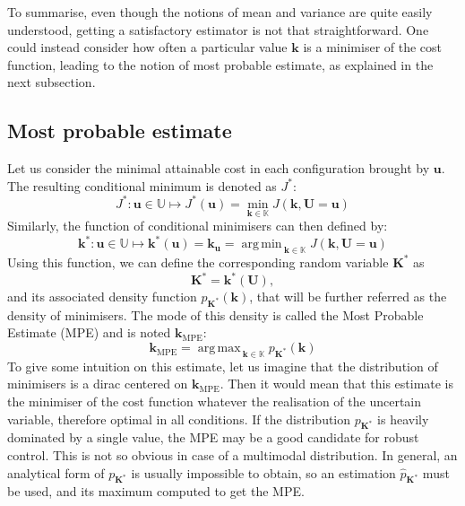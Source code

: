 \documentclass[preprint, 1p]{elsarticle}
\DeclareMathOperator*{\argmin}{arg\,min \,}
\DeclareMathOperator*{\argmax}{arg\,max \,}
\newcommand{\kmpe}{{\mathbf{k}}_{\mathrm{MPE}}}
\newcommand{\Kspace}{\mathbb{K}}
\newcommand{\Uspace}{\mathbb{U}}
\begin{document}
To summarise, even though the notions of mean and variance are quite easily understood, getting a satisfactory estimator is not that straightforward. One could instead consider how often a particular value $\mathbf{k}$ is a minimiser of the cost function, leading to the notion of most probable estimate, as explained in the next subsection.

\subsection{Most probable estimate}
Let us consider the minimal attainable cost in each configuration brought by $\mathbf{u}$.
The resulting conditional minimum is denoted as $J^*$:
\begin{equation}
\label{eq:def_Jstar}
J^*: \mathbf{u} \in\Uspace \longmapsto J^*(\mathbf{u}) = \min_{\mathbf{k}\in \Kspace} J(\mathbf{k},\mathbf{U}=\mathbf{u})
\end{equation}
Similarly, the function of conditional minimisers can then defined by:
  \begin{equation}
  \label{eq:conditional_minimiser}
   \mathbf{k}^*: \mathbf{u}\in\Uspace \longmapsto \mathbf{k}^*(\mathbf{u}) = \mathbf{k}_{\mathbf{u}}=  \argmin_{{\mathbf{k}}\in\Kspace} J({\mathbf{k}},\mathbf{U}=\mathbf{u})
  \end{equation}
Using this function, we can define the corresponding random variable $\mathbf{K}^*$ as
  \begin{equation}
    \label{eq:def_study_minimisers}
    \mathbf{K}^*= \mathbf{k}^*(\mathbf{U}),
  \end{equation}
and its associated density function $p_{\mathbf{K}^*}(\mathbf{k})$, that will be further referred as the density of minimisers.
The mode of this density is called the Most Probable Estimate (MPE) and is noted  $\kmpe$:
\begin{equation}
  \label{eq:MPE}
  \kmpe = \argmax_{\mathbf{k} \in\Kspace} p_{\mathbf{K}^*}(\mathbf{k}) 
\end{equation}
To give some intuition on this estimate, let us imagine that the distribution of minimisers is a dirac centered on $\kmpe$. Then it would mean that this estimate is the minimiser of the cost function whatever the realisation of the uncertain variable, therefore optimal in all conditions. 
If the distribution $p_{\mathbf{K}^*}$ is heavily dominated by a single value, the MPE may be a good candidate for robust control. This is not so obvious in case of a multimodal distribution. 
In general, an analytical form of $p_{\mathbf{K}^*}$ is usually impossible to obtain, so an estimation $\hat{p}_{\mathbf{K}^*}$ must be used, and its maximum computed to get the MPE.
\end{document}
